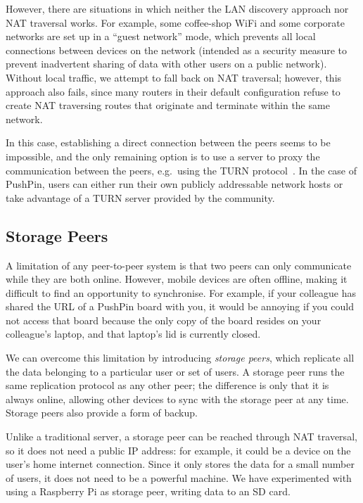 \documentclass[sigplan,10pt]{acmart}
\begin{document}
However, there are situations in which neither the LAN discovery approach nor NAT traversal works.
For example, some coffee-shop WiFi and some corporate networks are set up in a ``guest network'' mode, which prevents all local connections between devices on the network (intended as a security measure to prevent inadvertent sharing of data with other users on a public network).
Without local traffic, we attempt to fall back on NAT traversal; however, this approach also fails, since many routers in their default configuration refuse to create NAT traversing routes that originate and terminate within the same network.

In this case, establishing a direct connection between the peers seems to be impossible, and the only remaining option is to use a server to proxy the communication between the peers, e.g.\ using the TURN protocol~\cite{RFC5766}.
In the case of PushPin, users can either run their own publicly addressable network hosts or take advantage of a TURN server provided by the community.

\subsection{Storage Peers}

A limitation of any peer-to-peer system is that two peers can only communicate while they are both online.
However, mobile devices are often offline, making it difficult to find an opportunity to synchronise.
For example, if your colleague has shared the URL of a PushPin board with you, it would be annoying if you could not access that board because the only copy of the board resides on your colleague's laptop, and that laptop's lid is currently closed.

We can overcome this limitation by introducing \emph{storage peers}, which replicate all the data belonging to a particular user or set of users.
A storage peer runs the same replication protocol as any other peer; the difference is only that it is always online, allowing other devices to sync with the storage peer at any time.
Storage peers also provide a form of backup.

Unlike a traditional server, a storage peer can be reached through NAT traversal, so it does not need a public IP address: for example, it could be a device on the user's home internet connection.
Since it only stores the data for a small number of users, it does not need to be a powerful machine.
We have experimented with using a Raspberry Pi as storage peer, writing data to an SD card.
\end{document}
